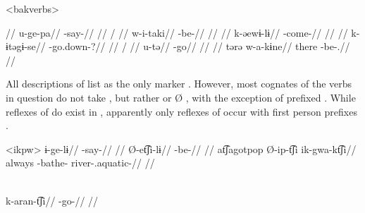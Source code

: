 \pex[everyglpreamble=]<bakverbs> \bakairi \parencite[][131, 397, 76, 137, 374, 130]{von1892bakairi}
\begin{multicols}{2}
\begingl
\glpreamble {} //
\gla u-ge-pa//
\glb {}-say-//
\glft {}//
\endgl
{}
\begingl
\glpreamble {} /  //
\gla w-i-taki//
\glb {}-be-//
\glft {}//
\endgl
{}
\begingl
\glpreamble {} //
\gla k-əewɨ-lɨ//
\glb {}-come-//
\glft {}//
\endgl
{}
\begingl
\glpreamble {} //
\gla k-ɨtəgɨ-se//
\glb {}-go.down-?//
\glft {}//
\endgl
{}
\begingl
\glpreamble {} / //
\gla u-tə//
\glb {}-go//
\glft {}//
\endgl
{}
\begingl
\glpreamble {}//
\gla tərə w-a-kɨne//
\glb there -be-.//
\glft {}//
\endgl
\end{multicols}
\xe

All descriptions of \ikpeng list  as the only  marker \parencites[55]{ikpengpacheco1997}[105]{campetela1997analise}[64]{ikpengpacheco2001}[205]{alves2013verbo}.
However, most \ikpeng cognates of the verbs in question do not take , but rather  or Ø , with the exception of prefixed  .
While reflexes of   do exist in \ikpeng, apparently only reflexes of   occur with first person prefixes \parencite[401]{gildea2018reconstructing}.

\pex<ikpw>\ikpeng
{}
\begingl
\gla ɨ-ge-lɨ//
\glb {}-say-//
\glft {} \parencite[][209]{ikpengpacheco2001}//
\endgl
{}
\begingl
\gla Ø-et͡ʃi-lɨ//
\glb {}-be-//
\glft {} \parencite[][139]{ikpengpacheco2001}//
\endgl
{}
\begingl
\gla at͡ʃagotpop Ø-ip-t͡ʃi ik-gwa-kt͡ʃi//
\glb always -bathe- river-.aquatic-//
\glft {} \parencite[][68]{ikpengpacheco1997}//
\endgl
\xe

\ikpeng \parencite[][80]{ikpengpacheco2001}\\
\begingl
\gla k-aran-t͡ʃi//
\glb {}-go-//
\glft {}//
\endgl
\xe



